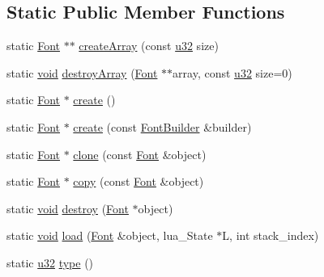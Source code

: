 \subsection*{Static Public Member Functions}
\begin{DoxyCompactItemize}
\item 
static \mbox{\hyperlink{classnjli_1_1_font}{Font}} $\ast$$\ast$ \mbox{\hyperlink{classnjli_1_1_font_a09c8252c07f9654854e9d600ad248e63}{create\+Array}} (const \mbox{\hyperlink{_util_8h_a10e94b422ef0c20dcdec20d31a1f5049}{u32}} size)
\item 
static \mbox{\hyperlink{_thread_8h_af1e856da2e658414cb2456cb6f7ebc66}{void}} \mbox{\hyperlink{classnjli_1_1_font_ad9e4b917edccd15dabcbdab0db46c2a4}{destroy\+Array}} (\mbox{\hyperlink{classnjli_1_1_font}{Font}} $\ast$$\ast$array, const \mbox{\hyperlink{_util_8h_a10e94b422ef0c20dcdec20d31a1f5049}{u32}} size=0)
\item 
static \mbox{\hyperlink{classnjli_1_1_font}{Font}} $\ast$ \mbox{\hyperlink{classnjli_1_1_font_aee1458a34b7adc94843a0837ff3bf1e4}{create}} ()
\item 
static \mbox{\hyperlink{classnjli_1_1_font}{Font}} $\ast$ \mbox{\hyperlink{classnjli_1_1_font_a67923e02c5b1f11350d1d0be02c5329c}{create}} (const \mbox{\hyperlink{classnjli_1_1_font_builder}{Font\+Builder}} \&builder)
\item 
static \mbox{\hyperlink{classnjli_1_1_font}{Font}} $\ast$ \mbox{\hyperlink{classnjli_1_1_font_aecf1de07e7bf8f09b50876385042307b}{clone}} (const \mbox{\hyperlink{classnjli_1_1_font}{Font}} \&object)
\item 
static \mbox{\hyperlink{classnjli_1_1_font}{Font}} $\ast$ \mbox{\hyperlink{classnjli_1_1_font_a85aaa51dad67e045e6638b1db0356525}{copy}} (const \mbox{\hyperlink{classnjli_1_1_font}{Font}} \&object)
\item 
static \mbox{\hyperlink{_thread_8h_af1e856da2e658414cb2456cb6f7ebc66}{void}} \mbox{\hyperlink{classnjli_1_1_font_a618f71d7b128184b48567594d821016b}{destroy}} (\mbox{\hyperlink{classnjli_1_1_font}{Font}} $\ast$object)
\item 
static \mbox{\hyperlink{_thread_8h_af1e856da2e658414cb2456cb6f7ebc66}{void}} \mbox{\hyperlink{classnjli_1_1_font_a17f3c8fe2c40d4a5109fc9262ff1386e}{load}} (\mbox{\hyperlink{classnjli_1_1_font}{Font}} \&object, lua\+\_\+\+State $\ast$L, int stack\+\_\+index)
\item 
static \mbox{\hyperlink{_util_8h_a10e94b422ef0c20dcdec20d31a1f5049}{u32}} \mbox{\hyperlink{classnjli_1_1_font_a0e79b95a46dff1253ab6f4e6958cad3e}{type}} ()
\end{DoxyCompactItemize}
